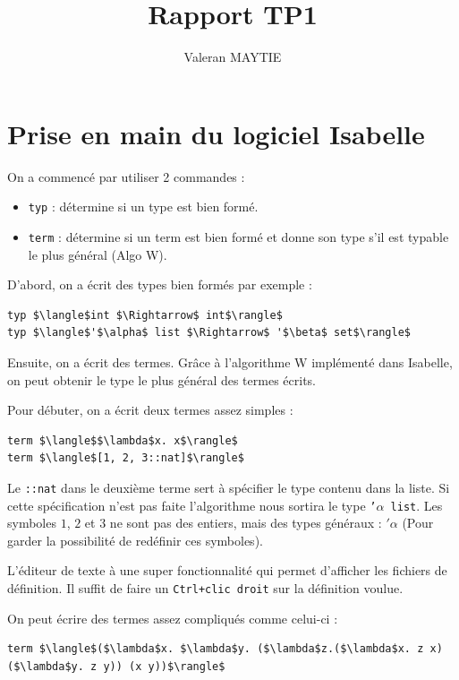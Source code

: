 \documentclass{article}
\title{Rapport TP1}
\author{Valeran MAYTIE}
\date{}
\theoremstyle{plain}
\begin{document}
  \maketitle

  \section{Prise en main du logiciel Isabelle}

  On a commencé par utiliser 2 commandes :

  \begin{itemize}
    \item \texttt{typ}  : détermine si un type est bien formé.
    \item \texttt{term} : détermine si un term est bien formé et donne son type
      s'il est typable le plus général (Algo W).
  \end{itemize}

  D'abord, on a écrit des types bien formés par exemple :

  \begin{lstlisting}
typ $\langle$int $\Rightarrow$ int$\rangle$
typ $\langle$'$\alpha$ list $\Rightarrow$ '$\beta$ set$\rangle$
  \end{lstlisting}

  Ensuite, on a écrit des termes. Grâce à l'algorithme W implémenté dans
  Isabelle, on peut obtenir le type le plus général des termes écrits.

  Pour débuter, on a écrit deux termes assez simples :

  \begin{lstlisting}
term $\langle$$\lambda$x. x$\rangle$
term $\langle$[1, 2, 3::nat]$\rangle$
  \end{lstlisting}

  Le \texttt{::nat} dans le deuxième terme sert à spécifier le type contenu dans
  la liste. Si cette spécification n'est pas faite l'algorithme nous sortira le
  type \texttt{'$\alpha$ list}. Les symboles $1$, $2$ et $3$ ne sont pas des
  entiers, mais des types généraux : $'\alpha$ (Pour garder la possibilité de
  redéfinir ces symboles).

  L'éditeur de texte à une super fonctionnalité qui permet d'afficher les
  fichiers de définition. Il suffit de faire un \texttt{Ctrl+clic droit} sur la
  définition voulue.

  On peut écrire des termes assez compliqués comme celui-ci :

\begin{lstlisting}
term $\langle$($\lambda$x. $\lambda$y. ($\lambda$z.($\lambda$x. z x) ($\lambda$y. z y)) (x y))$\rangle$
\end{lstlisting}
\end{document}
